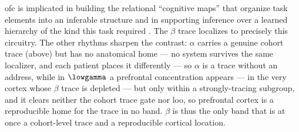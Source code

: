\gls{ofc} is implicated in building the relational ``cognitive maps'' that organize task elements into an inferable structure \cite{schuck2016human} and in supporting inference over a learned hierarchy of the kind this task required \cite{park2021inferences}. The \(\beta\) trace localizes to precisely this circuitry. The other rhythms sharpen the contrast: \(\alpha\) carries a genuine cohort trace (above) but has no anatomical home --- no system survives the same localizer, and each patient places it differently --- so \(\alpha\) is a trace without an address, while in \(\lowgamma\) a prefrontal concentration appears --- in the very cortex whose \(\beta\) trace is depleted --- but only within a strongly-tracing subgroup, and it clears neither the cohort trace gate nor \gls{loo}, so prefrontal cortex is a reproducible home for the trace in no band. \(\beta\) is thus the only band that is at once a cohort-level trace and a reproducible cortical location.
